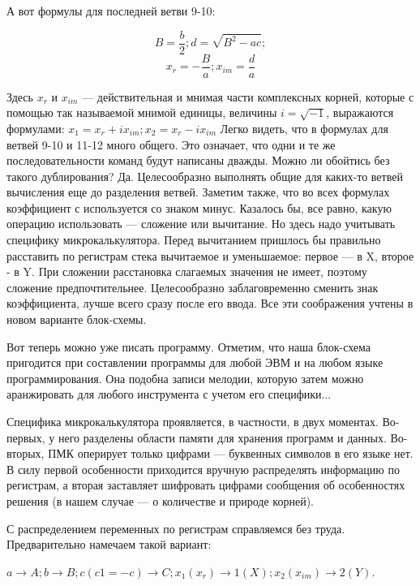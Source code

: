 \documentclass[11pt,a4paper,oneside]{article}
\begin{document}
А вот формулы для последней ветви 9-10:

\begin{equation}
B=\frac{b}{2}; d=\sqrt{B^{2}-ac};
\end{equation}
\begin{equation}
x_{r}=-\frac{B}{a}; x_{im}=\frac{d}{a}
\end{equation}

Здесь $x_{r}$ и $x_{im}$ — действительная и мнимая части комплексных корней, которые с помощью так называемой мнимой единицы, величины $i=\sqrt{-1}$, выражаются формулами:
$x_{1}=x_{r} + ix_{im}; x_{2} = x_{r} - ix_{im}$ Легко видеть, что в формулах для ветвей 9-10 и 11-12 много общего. Это означает, что одни и те же последовательности команд будут написаны дважды. Можно ли обойтись без такого дублирования? Да. Целесообразно выполнять общие для каких-то ветвей вычисления еще до разделения ветвей. Заметим также, что во всех формулах коэффициент с используется со знаком минус. Казалось бы, все равно, какую операцию использовать — сложение или вычитание. Но здесь надо учитывать специфику микрокалькулятора. Перед вычитанием пришлось бы правильно расставить по регистрам стека вычитаемое и уменьшаемое: первое — в X, второе - в Y. При сложении расстановка слагаемых значения не имеет, поэтому сложение предпочтительнее. Целесообразно заблаговременно сменить знак коэффициента, лучше всего сразу после его ввода. Все эти соображения учтены в новом варианте блок-схемы.

Вот теперь можно уже писать программу. Отметим, что наша блок-схема пригодится при составлении программы для любой ЭВМ и на любом языке программирования. Она подобна записи мелодии, которую затем можно аранжировать для любого инструмента с учетом его специфики...

Специфика микрокалькулятора проявляется, в частности, в двух моментах. Во-первых, у него разделены области памяти для хранения программ и данных. Во-вторых, ПМК оперирует только цифрами — буквенных символов в его языке нет. В силу первой особенности приходится вручную распределять информацию по регистрам, а вторая заставляет шифровать цифрами сообщения об особенностях решения (в нашем случае — о количестве и природе корней).

С распределением переменных по регистрам справляемся без труда. Предварительно намечаем такой вариант:

$a \rightarrow A; b \rightarrow B; c (c1 = -c) \rightarrow C;
x_{1} (x_{r}) \rightarrow 1(X); x_{2}(x_{im}) \rightarrow 2(Y)$.
\end{document}

